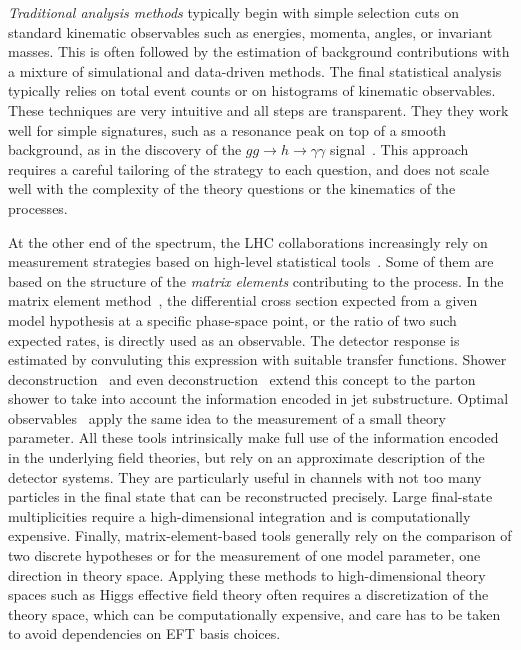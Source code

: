 \emph{Traditional analysis methods} typically begin with simple
selection cuts on standard kinematic observables such as energies,
momenta, angles, or invariant masses. This is often followed by the
estimation of background contributions with a mixture of simulational
and data-driven methods. The final statistical analysis typically
relies on total event counts or on histograms of kinematic
observables.  These techniques are very intuitive and all steps are
transparent. They they work well for simple signatures, such as a
resonance peak on top of a smooth background, as in the discovery of
the $gg \to h \to \gamma \gamma$
signal~\cite{Aad:2012tfa,Chatrchyan:2012xdj}. This approach requires a
careful tailoring of the strategy to each question, and does not scale
well with the complexity of the theory questions or the kinematics of
the processes.

At the other end of the spectrum, the LHC collaborations increasingly
rely on measurement strategies based on high-level statistical
tools~\cite{cranmer:nips2016}. Some of them are based on the structure
of the \emph{matrix elements} contributing to the process. In the
matrix element method~\cite{Kondo:1988yd, Abazov:2004cs, Gao:2010qx,
  Alwall:2010cq, Avery:2012um, Andersen:2012kn, Campbell:2013hz,
  Artoisenet:2013vfa, Martini:2015fsa, Gritsan:2016hjl}, the
differential cross section expected from a given model hypothesis at a
specific phase-space point, or the ratio of two such expected rates,
is directly used as an observable. The detector response is estimated
by convuluting this expression with suitable transfer
functions. Shower deconstruction~\cite{Soper:2011cr, Soper:2012pb} and
even deconstruction~\cite{Soper:2014rya} extend this concept to the
parton shower to take into account the information encoded in jet
substructure. Optimal observables~\cite{Atwood:1991ka, Davier:1992nw,
  Diehl:1993br} apply the same idea to the measurement of a small
theory parameter. All these tools intrinsically make full use of the
information encoded in the underlying field theories, but rely on an
approximate description of the detector systems. They are particularly
useful in channels with not too many particles in the final state that
can be reconstructed precisely. Large final-state multiplicities
require a high-dimensional integration and is computationally
expensive. Finally, matrix-element-based tools generally rely on the
comparison of two discrete hypotheses or for the measurement of one
model parameter, \ie one direction in theory space. Applying these
methods to high-dimensional theory spaces such as Higgs effective
field theory often requires a discretization of the theory space,
which can be computationally expensive, and care has to be taken to
avoid dependencies on EFT basis choices.

